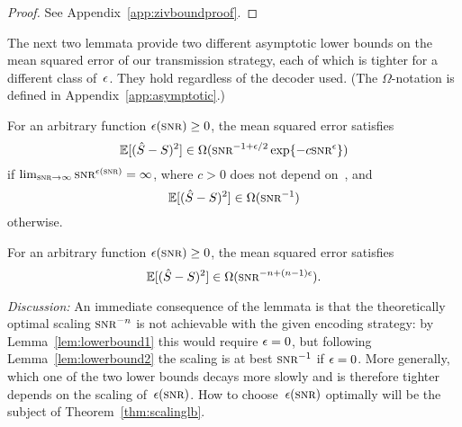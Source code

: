 \begin{proof}
  See Appendix~\ref{app:zivboundproof}.
\end{proof}

The next two lemmata provide two different asymptotic lower bounds on the
mean squared error of our transmission strategy, each of which is tighter for a
different class of~$\epsilon$. They hold regardless of the decoder used.  (The
$\Omega$-notation is defined in Appendix~\ref{app:asymptotic}.)

\begin{lemma}
  \label{lem:lowerbound2}
  For an arbitrary function $\e(\snr) \ge 0$, the mean squared error
  satisfies
  \begin{equation*}
    \mse \in \Omega(\snr^{-1+\e/2} \exp\{-c\snr^\e\})
  \end{equation*}
  if $\limtoinf{\snr} \snr^{\e(\snr)} = \infty$, where $c>0$ does not depend
  on~\snr, and
  \begin{equation*}
    \mse \in \Omega(\snr^{-1})
  \end{equation*}
  otherwise.
\end{lemma}

\begin{lemma}
  \label{lem:lowerbound1}
  For an arbitrary function $\e(\snr) \ge 0$, the mean squared error satisfies
  \begin{equation*}
    \mse \in \Omega(\snr^{-n + (n-1)\e}).
  \end{equation*}
\end{lemma}

\emph{Discussion:} An immediate consequence of the lemmata is that the
theoretically optimal scaling $\snr^{-n}$ is not achievable with the given
encoding strategy: by Lemma~\ref{lem:lowerbound1} this would require $\epsilon = 0$,
but following Lemma~\ref{lem:lowerbound2} the scaling is at best $\snr^{-1}$ if
$\epsilon = 0 $.  More generally, which one of the two lower bounds decays more slowly
and is therefore tighter depends on the scaling of~$\e(\snr)$. How to
choose~$\e(\snr)$ optimally will be the subject of Theorem~\ref{thm:scalinglb}.

